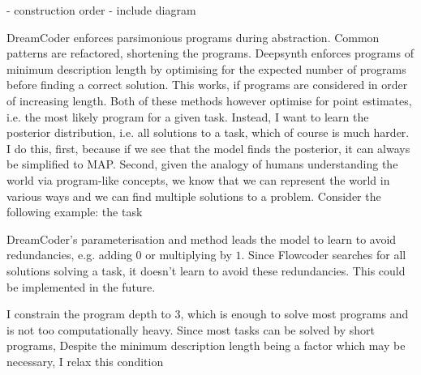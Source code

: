 - construction order
- include diagram









DreamCoder enforces parsimonious programs during abstraction. Common patterns are refactored, shortening the programs. Deepsynth enforces programs of minimum description length by optimising for the expected number of programs before finding a correct solution. This works, if programs are considered in order of increasing length. Both of these methods however optimise for point estimates, i.e. the most likely program for a given task. Instead, I want to learn the posterior distribution, i.e. all solutions to a task, which of course is much harder.
I do this, first, because if we see that the model finds the posterior, it can always be simplified to MAP. Second, given the analogy of humans understanding the world via program-like concepts, we know that we can represent the world in various ways and we can find multiple solutions to a problem. Consider the following example: the task 

DreamCoder's parameterisation and method leads the model to learn to avoid redundancies, e.g. adding $0$ or multiplying by $1$. Since Flowcoder searches for all solutions solving a task, it doesn't learn to avoid these redundancies. This could be implemented in the future.

I constrain the program depth to 3, which is enough to solve most programs and is not too computationally heavy.
Since most tasks can be solved by short programs, 
Despite the minimum description length being a factor which may be necessary, I relax this condition






\subsection{}







